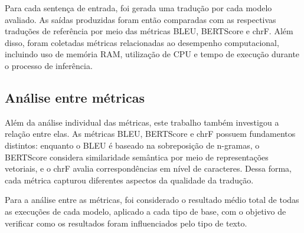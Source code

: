 Para cada sentença de entrada, foi gerada uma tradução por cada modelo avaliado. As saídas produzidas foram então comparadas com as respectivas traduções de referência por meio das métricas BLEU, BERTScore e chrF. Além disso, foram coletadas métricas relacionadas ao desempenho computacional, incluindo uso de memória RAM, utilização de CPU e tempo de execução durante o processo de inferência.


\subsection{Análise entre métricas}

Além da análise individual das métricas, este trabalho também investigou a relação entre elas. As métricas BLEU, BERTScore e chrF possuem fundamentos distintos: enquanto o BLEU é baseado na sobreposição de n-gramas, o BERTScore considera similaridade semântica por meio de representações vetoriais, e o chrF avalia correspondências em nível de caracteres. Dessa forma, cada métrica capturou diferentes aspectos da qualidade da tradução.

Para a análise entre as métricas, foi considerado o resultado médio total de todas as execuções de cada modelo, aplicado a cada tipo de base, com o objetivo de verificar como os resultados foram influenciados pelo tipo de texto.




